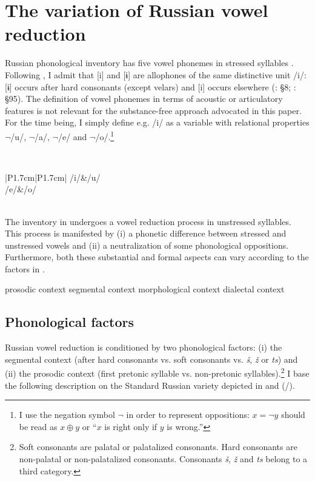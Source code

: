 \documentclass[output=paper,
modfonts,
newtxmath,
hidelinks,
]{langscibook}
\begin{document}
\section{The variation of Russian vowel reduction}\label{5:s2}

Russian phonological inventory has five vowel phonemes in stressed syllables . Following \citet[§19]{Garde1998}, I admit that [i] and [ɨ] are allophones of the same distinctive unit /i/: [ɨ] occurs after hard consonants (except velars) and [i] occurs elsewhere (\citealt{Avanesov1968}: §8; \citealt{Garde1998}: §95). The definition of vowel phonemes in terms of acoustic or articulatory features is not relevant for the substance-free approach advocated in this paper. For the time being, I simply define e.g. /i/ as a variable with relational properties $\neg$/u/, $\neg$/a/, $\neg$/e/ and $\neg$/o/.\footnote{\label{5:fn1}I use the negation symbol $\neg$ in order to represent oppositions: $x=\neg y$ should be read as $x\oplus y$ or “$x$ is right only if $y$ is wrong.”}

\label{5:1}\\\medskip
\begin{tabular}{|P{1.7cm}|P{1.7cm}|}
\hline
/i/&/u/\\\hline
/e/&/o/\\\hline
{}\\\hline
\end{tabular}
\z

\noindent The inventory in  undergoes a vowel reduction process in unstressed syllables. This process is manifested by (i) a phonetic difference between stressed and unstressed vowels and (ii) a neutralization of some phonological oppositions. Furthermore, both these substantial and formal aspects can vary according to the factors in .

\ea\label{5:2}\ea prosodic context
\ex segmental context
\ex morphological context
\ex dialectal context
\z\z

\subsection{Phonological factors}\label{5:s2.1}

Russian vowel reduction is conditioned by two phonological factors: (i) the segmental context (after hard consonants vs. soft consonants vs. \textit{š}, \textit{ž} or \textit{ts}) and (ii) the prosodic context (first pretonic syllable vs. non-pretonic syllables).\footnote{Soft consonants are palatal or palatalized consonants. Hard consonants are non-palatal or non-palatalized consonants. Consonants \textit{š}, \textit{ž} and \textit{ts} belong to a third category.} I base the following description on the Standard Russian variety depicted in \citet{Avanesov1968} and \citeauthor{Garde1980} (\citeyear{Garde1980}/\citeyear{Garde1998}).
\end{document}
